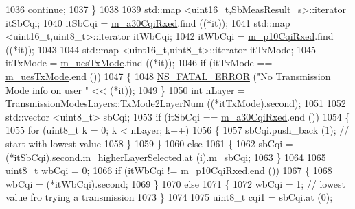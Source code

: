 \begin{DoxyCode}
1036                   \textcolor{keywordflow}{continue};
1037                 \}
1038 
1039               std::map <uint16\_t,SbMeasResult\_s>::iterator itSbCqi;
1040               itSbCqi = \hyperlink{classns3_1_1TtaFfMacScheduler_aeb3f62c230eed9a1e5488b7466c26d56}{m\_a30CqiRxed}.find ((*it));
1041               std::map <uint16\_t,uint8\_t>::iterator itWbCqi;
1042               itWbCqi = \hyperlink{classns3_1_1TtaFfMacScheduler_a0846e060ed4b553be784ddba3098eb81}{m\_p10CqiRxed}.find ((*it));
1043 
1044               std::map <uint16\_t,uint8\_t>::iterator itTxMode;
1045               itTxMode = \hyperlink{classns3_1_1TtaFfMacScheduler_af212e1d69d8cbe7785eaea3fb3161953}{m\_uesTxMode}.find ((*it));
1046               \textcolor{keywordflow}{if} (itTxMode == \hyperlink{classns3_1_1TtaFfMacScheduler_af212e1d69d8cbe7785eaea3fb3161953}{m\_uesTxMode}.end ())
1047                 \{
1048                   \hyperlink{group__fatal_ga5131d5e3f75d7d4cbfd706ac456fdc85}{NS\_FATAL\_ERROR} (\textcolor{stringliteral}{"No Transmission Mode info on user "} << (*it));
1049                 \}
1050               \textcolor{keywordtype}{int} nLayer = \hyperlink{classns3_1_1TransmissionModesLayers_a31f608b7bfaa77440fe4cb85ad035329}{TransmissionModesLayers::TxMode2LayerNum}
       ((*itTxMode).second);
1051 
1052               std::vector <uint8\_t> sbCqi;
1053               \textcolor{keywordflow}{if} (itSbCqi == \hyperlink{classns3_1_1TtaFfMacScheduler_aeb3f62c230eed9a1e5488b7466c26d56}{m\_a30CqiRxed}.end ())
1054                 \{
1055                   \textcolor{keywordflow}{for} (uint8\_t k = 0; k < nLayer; k++)
1056                     \{
1057                       sbCqi.push\_back (1);  \textcolor{comment}{// start with lowest value}
1058                     \}
1059                 \}
1060               \textcolor{keywordflow}{else}
1061                 \{
1062                   sbCqi = (*itSbCqi).second.m\_higherLayerSelected.at (\hyperlink{bernuolliDistribution_8m_a6f6ccfcf58b31cb6412107d9d5281426}{i}).m\_sbCqi;
1063                 \}
1064 
1065               uint8\_t wbCqi = 0;
1066               \textcolor{keywordflow}{if} (itWbCqi != \hyperlink{classns3_1_1TtaFfMacScheduler_a0846e060ed4b553be784ddba3098eb81}{m\_p10CqiRxed}.end ())
1067                 \{
1068                   wbCqi = (*itWbCqi).second;
1069                 \}
1070               \textcolor{keywordflow}{else}
1071                 \{
1072                   wbCqi = 1; \textcolor{comment}{// lowest value fro trying a transmission}
1073                 \}
1074 
1075               uint8\_t cqi1 = sbCqi.at (0);

\end{DoxyCode}
